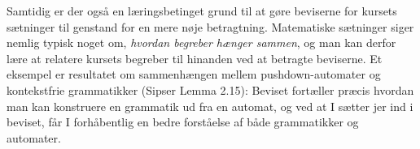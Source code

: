 \documentclass[11pt,a4paper,article,oneside]{memoir}
\begin{document}
Samtidig er der også en læringsbetinget grund til at gøre beviserne for
kursets sætninger til genstand for en mere nøje betragtning. Matematiske
sætninger siger nemlig typisk noget om, \emph{hvordan begreber hænger
  sammen}, og man kan derfor lære at relatere kursets begreber til
hinanden ved at betragte beviserne. Et eksempel er resultatet om
sammenhængen mellem pushdown-automater og kontekstfrie grammatikker
(Sipser Lemma 2.15): Beviset fortæller præcis hvordan man kan konstruere
en grammatik ud fra en automat, og ved at I sætter jer ind i beviset, får
I forhåbentlig en bedre forståelse af både grammatikker og automater.
\end{document}
